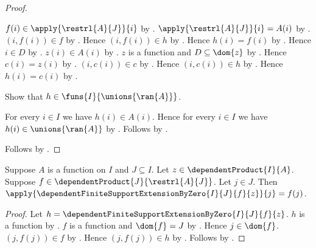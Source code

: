 \begin{proof}
\begin{subproof}
\begin{byCase}
            $f(i)\in\apply{\restrl{A}{J}}{i}$ by
                .
            $\apply{\restrl{A}{J}}{i}=A(i)$ by
                .
            $(i,f(i))\in f$ by .
            Hence $(i,f(i))\in h$ by .
            Hence $h(i)=f(i)$ by .
            Hence $i\in D$ by .
            $z(i)\in A(i)$ by .
            $z$ is a function and $D\subseteq\dom{z}$ by
                .
            Hence $c(i)=z(i)$ by
                .
            $(i,c(i))\in c$ by .
            Hence $(i,c(i))\in h$ by .
            Hence $h(i)=c(i)$ by .
        \end{byCase}
    \end{subproof}
    Show that $h\in\funs{I}{\unions{\ran{A}}}$.
    \begin{subproof}
        For every $i\in I$ we have $h(i)\in A(i)$.
        Hence for every $i\in I$ we have
            $h(i)\in\unions{\ran{A}}$ by
            .
        Follows by .
    \end{subproof}
    Follows by .
\end{proof}

\begin{proposition}\label{dependent_finite_support_extension_by_zero_on_domain}
    Suppose $A$ is a function on $I$ and $J\subseteq I$.
    Let $z\in\dependentProduct{I}{A}$.
    Suppose $f\in\dependentProduct{J}{\restrl{A}{J}}$.
    Let $j\in J$.
    Then
        $\apply{\dependentFiniteSupportExtensionByZero{I}{J}{f}{z}}{j}
        =f(j)$.
\end{proposition}
\begin{proof}
    Let $h=\dependentFiniteSupportExtensionByZero{I}{J}{f}{z}$.
    $h$ is a function by
        .
    $f$ is a function and $\dom{f}=J$ by
        .
    Hence $j\in\dom{f}$.
    $(j,f(j))\in f$ by
        .
    Hence $(j,f(j))\in h$ by
        .
    Follows by .
\end{proof}

